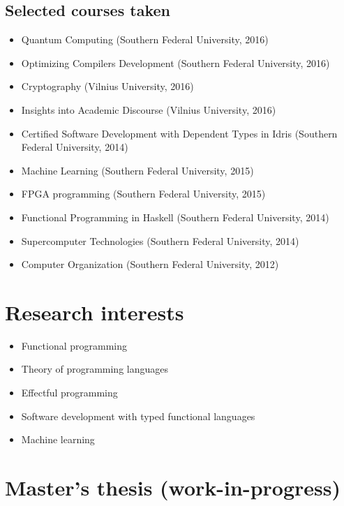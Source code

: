 \documentclass[11pt,a4paper,sans]{moderncv} %
\begin{document}
\subsection{Selected courses taken}

\begin{itemize}
  \item Quantum Computing (Southern Federal University, 2016)
  \item Optimizing Compilers Development (Southern Federal University, 2016)
  \item Cryptography (Vilnius University, 2016)
  \item Insights into Academic Discourse (Vilnius University, 2016)
  \item Certified Software Development with Dependent Types in Idris (Southern Federal University, 2014)
  \item Machine Learning (Southern Federal University, 2015)
  \item FPGA programming (Southern Federal University, 2015)
  \item Functional Programming in Haskell (Southern Federal University, 2014)
  \item Supercomputer Technologies (Southern Federal University, 2014)
  \item Computer Organization (Southern Federal University, 2012)
\end{itemize}


\section{Research interests}

\begin{itemize}
  \item Functional programming
  \item Theory of programming languages
  \item Effectful programming
  \item Software development with typed functional languages
  \item Machine learning
\end{itemize}

\section{Master's thesis (work-in-progress)}
\end{document}
